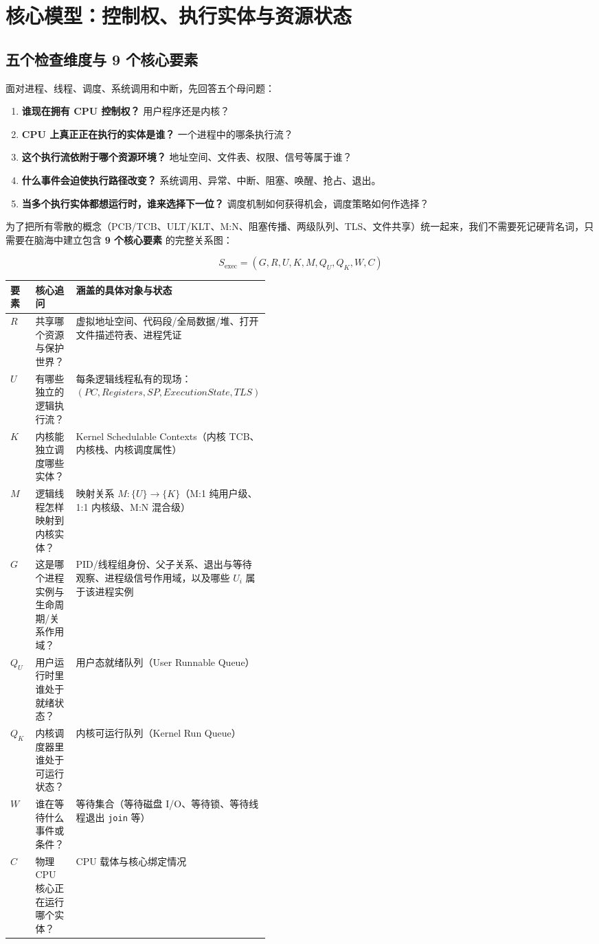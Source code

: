 \documentclass[11pt,a4paper]{ctexart}
\newcommand{\kw}[1]{\textbf{#1}}
\newcommand{\code}[1]{\texttt{#1}}
\begin{document}
\tableofcontents
\newpage

\section{核心模型：控制权、执行实体与资源状态}

\subsection{五个检查维度与 9 个核心要素}

面对进程、线程、调度、系统调用和中断，先回答五个母问题：

\begin{enumerate}
  \item \kw{谁现在拥有 CPU 控制权？} 用户程序还是内核？
  \item \kw{CPU 上真正正在执行的实体是谁？} 一个进程中的哪条执行流？
  \item \kw{这个执行流依附于哪个资源环境？} 地址空间、文件表、权限、信号等属于谁？
  \item \kw{什么事件会迫使执行路径改变？} 系统调用、异常、中断、阻塞、唤醒、抢占、退出。
  \item \kw{当多个执行实体都想运行时，谁来选择下一位？} 调度机制如何获得机会，调度策略如何作选择？
\end{enumerate}

为了把所有零散的概念（PCB/TCB、ULT/KLT、M:N、阻塞传播、两级队列、TLS、文件共享）统一起来，我们不需要死记硬背名词，只需要在脑海中建立包含 \kw{9 个核心要素} 的完整关系图：

\[
\boxed{
S_{\text{exec}} = (G, R, U, K, M, Q_U, Q_K, W, C)
}
\]

\begingroup
\small
\renewcommand{\arraystretch}{1.22}
\setlength{\tabcolsep}{5pt}
\begin{tabularx}{\linewidth}{>{\bfseries}p{0.12\linewidth} p{0.32\linewidth} X}
\toprule
要素 & 核心追问 & 涵盖的具体对象与状态\\
\midrule
$R$ & 共享哪个资源与保护世界？ & 虚拟地址空间、代码段/全局数据/堆、打开文件描述符表、进程凭证\\
$U$ & 有哪些独立的逻辑执行流？ & 每条逻辑线程私有的现场：$(PC, Registers, SP, ExecutionState, TLS)$\\
$K$ & 内核能独立调度哪些实体？ & Kernel Schedulable Contexts（内核 TCB、内核栈、内核调度属性）\\
$M$ & 逻辑线程怎样映射到内核实体？ & 映射关系 $M: \{U\} \to \{K\}$（M:1 纯用户级、1:1 内核级、M:N 混合级）\\
$G$ & 这是哪个进程实例与生命周期/关系作用域？ & PID/线程组身份、父子关系、退出与等待观察、进程级信号作用域，以及哪些 $U_i$ 属于该进程实例\\
$Q_U$ & 用户运行时里谁处于就绪状态？ & 用户态就绪队列（User Runnable Queue）\\
$Q_K$ & 内核调度器里谁处于可运行状态？ & 内核可运行队列（Kernel Run Queue）\\
$W$ & 谁在等待什么事件或条件？ & 等待集合（等待磁盘 I/O、等待锁、等待线程退出 \code{join} 等）\\
$C$ & 物理 CPU 核心正在运行哪个实体？ & CPU 载体与核心绑定情况\\
\bottomrule
\end{tabularx}
\endgroup
\end{document}
